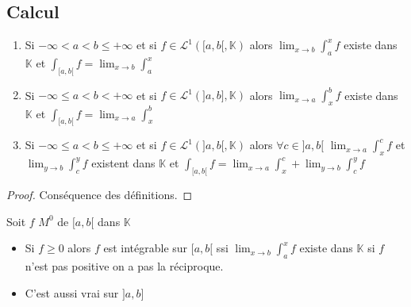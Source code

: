 \documentclass[11pt,hidelinks]{book}
\theoremstyle{mytheoremstyle}
\theoremstyle{mytheoremstyle}
\theoremstyle{mytheoremstyle}
\theoremstyle{mytheoremstyle}
\theoremstyle{mytheoremstyle}
\theoremstyle{mytheoremstyle}
\theoremstyle{mytheoremstyle}
\theoremstyle{mytheoremstyle}
\theoremstyle{myproblemstyle}
\def\mbb#1{\mathbb{#1}}
\def\mfc#1{\mathcal{#1}}
\def\LI#1{\mfc{L}^1(#1,\bK)}
\def\bK{\mbb{K}}
\def\ab{[a,b[}
\def\abc{]a,b]}
\def\abd{]a,b[}
\begin{document}
    \subsection{Calcul}
    \begin{adjustwidth}{-2em}{-1em}
    \begin{theorem}
        \begin{enumerate}
        \item Si $-\infty < a < b \leq + \infty$ et si $f \in \LI{\ab}$
        alors $\lim_{x \to b} \int_{a}^{x} f$ existe dans $\bK$ et 
        $\int_{\ab} f = \lim_{x \to b} \int_{a}^{x}$ 
        
        \item Si $-\infty \leq a < b < + \infty$ et si $f \in \LI{\abc}$
        alors $\lim_{x \to a} \int_{x}^{b} f$ existe dans $\bK$ et 
        $\int_{\ab} f = \lim_{x \to a} \int_{x}^{b}$ 

        \item Si $-\infty \leq a < b \leq + \infty$ et si $f \in \LI{\abd}$
        alors $\forall c \in \abd$ $\lim_{x \to a} \int_{x}^{c} f$ et $\lim_{y \to b} \int_{c}^{y} f$ existent dans $\bK$ et 
        $\int_{\ab} f = \lim_{x \to a} \int_{x}^{c} + \lim_{y \to b} \int_{c}^{y} f$
        
    \end{enumerate}
    \begin{proof}
        Conséquence des définitions.
    \end{proof}
    \end{theorem}

    \begin{prop}
        Soit $f$ $M^0$ de $\ab$ dans $\bK$
        \begin{itemize}[label=$\circ$]
            \item Si $f \geq 0$ alors $f$ est intégrable sur $\ab$ ssi $\lim_{x \to b} \int_{a}^{x} f$ existe dans $\bK$ si $f$ n'est pas positive on a pas la réciproque.
            \item C'est aussi vrai sur $\abc$
        \end{itemize}
    \end{prop}


\end{adjustwidth}
\end{document}
